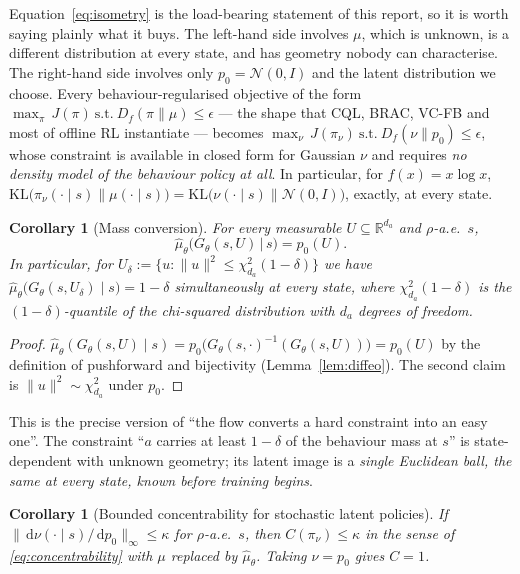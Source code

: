 \documentclass[11pt]{article}
\theoremstyle{plain}
\newtheorem{corollary}[lemma]{Corollary}
\theoremstyle{definition}
\theoremstyle{remark}
\newcommand{\R}{\mathbb R}
\newcommand{\1}{\mathbf 1}
\newcommand{\dd}{\,\mathrm d}
\newcommand{\Gth}{G_\theta}
\newcommand{\muhat}{\hat\mu_\theta}
\newcommand{\Udelta}{U_\delta}
\begin{document}
\noindent
Equation~\eqref{eq:isometry} is the load-bearing statement of this report, so it is worth
saying plainly what it buys. The left-hand side involves $\mu$, which is unknown, is a
different distribution at every state, and has geometry nobody can characterise. The
right-hand side involves only $p_0=\mathcal N(0,I)$ and the latent distribution we choose.
Every behaviour-regularised objective of the form
$\max_\pi\, J(\pi)\ \text{s.t.}\ D_f(\pi\|\mu)\le\epsilon$ --- the shape that CQL, BRAC,
VC-FB and most of offline RL instantiate --- becomes
$\max_\nu\, J(\pi_\nu)\ \text{s.t.}\ D_f(\nu\|p_0)\le\epsilon$, whose constraint is
available in closed form for Gaussian $\nu$ and requires \emph{no density model of the
behaviour policy at all}. In particular, for $f(x)=x\log x$,
$\mathrm{KL}\big(\pi_\nu(\cdot\mid s)\|\mu(\cdot\mid s)\big)
=\mathrm{KL}\big(\nu(\cdot\mid s)\|\mathcal N(0,I)\big)$, exactly, at every state.

\begin{corollary}[Mass conversion]
\label{cor:mass}
For every measurable $U\subseteq\R^{d_a}$ and $\rho$-a.e.\ $s$,
\begin{equation}
\label{eq:mass}
  \muhat\big(\Gth(s,U)\,\big|\,s\big)=p_0(U).
\end{equation}
In particular, for
$\Udelta:=\{u:\|u\|^2\le\chi^2_{d_a}(1-\delta)\}$ we have
$\muhat\big(\Gth(s,\Udelta)\mid s\big)=1-\delta$ \emph{simultaneously at every state},
where $\chi^2_{d_a}(1-\delta)$ is the $(1-\delta)$-quantile of the chi-squared
distribution with $d_a$ degrees of freedom.
\end{corollary}

\begin{proof}
$\muhat(\Gth(s,U)\mid s)=p_0\big(\Gth(s,\cdot)^{-1}(\Gth(s,U))\big)=p_0(U)$ by the
definition of pushforward and bijectivity (Lemma~\ref{lem:diffeo}). The second claim is
$\|u\|^2\sim\chi^2_{d_a}$ under $p_0$.
\end{proof}

\noindent
This is the precise version of ``the flow converts a hard constraint into an easy one''.
The constraint ``$a$ carries at least $1-\delta$ of the behaviour mass at $s$'' is
state-dependent with unknown geometry; its latent image is a \emph{single Euclidean ball,
the same at every state, known before training begins}.

\begin{corollary}[Bounded concentrability for stochastic latent policies]
\label{cor:conc}
If $\|\dd\nu(\cdot\mid s)/\dd p_0\|_\infty\le\kappa$ for $\rho$-a.e.\ $s$, then
$C(\pi_\nu)\le\kappa$ in the sense of \eqref{eq:concentrability} with $\mu$ replaced by
$\muhat$. Taking $\nu=p_0$ gives $C=1$.
\end{corollary}
\end{document}
